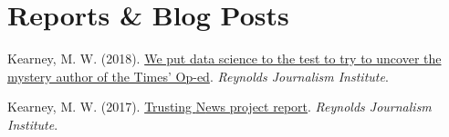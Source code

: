 \section{Reports \& Blog Posts}
\begin{bibenum}
\item Kearney, M. W. (2018). \href{https://www.rjionline.org/stories/we-put-data-science-to-the-test-to-try-to-uncover-the-mystery-author-of-the}{We put data science to the test to try to uncover the mystery author of the Times’ Op-ed}.
\textit{Reynolds Journalism Institute}.
\item Kearney, M. W. (2017). \href{https://www.rjionline.org/reporthtml.html}{Trusting {N}ews project report}.
\textit{Reynolds Journalism Institute}.
\end{bibenum}
